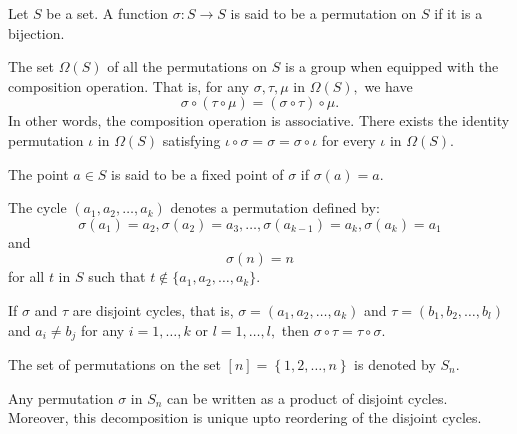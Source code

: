 
\begin{definition}[Permutation]
	Let $S$ be a set. A function $ \sigma \colon S \to S$ is said to be a
	permutation on $S$ if it is a bijection.
\end{definition}

The set $ \Omega (S) $ of all the permutations on $S$ is a group when equipped with the
composition operation.
That is, for any $\sigma, \tau, \mu$ in $ \Omega(S),$ we have
$$ \sigma \circ ( \tau \circ \mu) = (\sigma \circ \tau) \circ \mu.$$
In other words, the composition operation is associative.
There exists the identity permutation $ \iota $ in $ \Omega(S)$
satisfying $\iota \circ \sigma = \sigma = \sigma \circ \iota$
for every $\iota$ in $ \Omega(S).$

The point $a \in S$ is said to be a fixed point of $ \sigma $ if $ \sigma(a) = a.$

The cycle $(a_1, a_2, \dotsc, a_k)$ denotes a permutation defined by:
$$ \sigma(a_1) = a_2, \sigma(a_2) = a_3, \dotsc, \sigma(a _{k-1} ) = a_k, \sigma(a_k) = a_1$$
and 
$$ \sigma(n) = n$$
for all $t $ in $S$ such that $t \not \in \{a_1, a_2, \dotsc, a_k\}.$

If $\sigma$ and $ \tau$ are disjoint cycles, that is,
$ \sigma =  (a_1, a_2, \dotsc, a_k)$ and $\tau = (b_1, b_2, \dotsc, b_l) $
and $a_i \not = b_j$ for any $i = 1, \dotsc, k $ or $ l =1 ,\dotsc, l,$
then $ \sigma \circ \tau = \tau \circ \sigma.$

\begin{definition}[$S_n$]
	The set of permutations on the set $\left[ n \right] = \left\{ 1, 2, \dotsc, n \right\} $ is denoted by $S_n.$
\end{definition}

\begin{theorem}
	Any permutation $ \sigma $ in $S_n$ can be written as a product of disjoint cycles.
	Moreover, this decomposition is unique upto reordering of the disjoint cycles.
\end{theorem}

